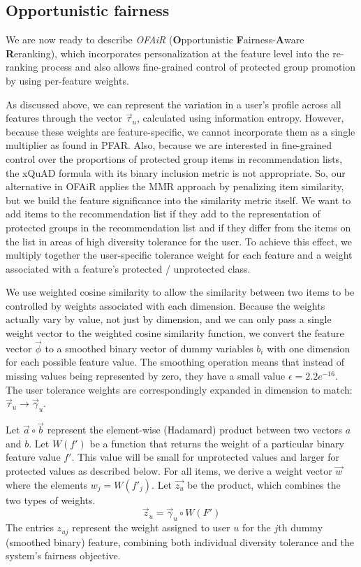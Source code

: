 \subsection{Opportunistic fairness}
\label{subsec:ofair_opp_fair}

We are now ready to describe \textit{OFAiR} (\textbf{O}pportunistic \textbf{F}airness-\textbf{A}ware \textbf{R}eranking), which incorporates personalization at the feature level into the re-ranking process and also allows fine-grained control of protected group promotion by using per-feature weights. 

As discussed above, we can represent the variation in a user's profile across all features through the vector $\vec{\tau}_u$, calculated using information entropy. However, because these weights are feature-specific, we cannot incorporate them as a single multiplier as found in PFAR. Also, because we are interested in fine-grained control over the proportions of protected group items in recommendation lists, the xQuAD formula with its binary inclusion metric is not appropriate. So, our alternative in OFAiR applies the MMR approach by penalizing item similarity, but we build the feature significance into the similarity metric itself. We want to add items to the recommendation list if they add to the representation of protected groups in the recommendation list and if they differ from the items on the list in areas of high diversity tolerance for the user. To achieve this effect, we multiply together the user-specific tolerance weight for each feature and a weight associated with a feature's protected / unprotected class. 

We use weighted cosine similarity to allow the similarity between two items to be controlled by weights associated with each dimension. Because the weights actually vary by value, not just by dimension, and we can only pass a single weight vector to the weighted cosine similarity function, we convert the feature vector $\vec{\phi}$ to a smoothed binary vector of dummy variables $b_i$ with one dimension for each possible feature value. The smoothing operation means that instead of missing values being represented by zero, they have a small value $\epsilon = 2.2e^{-16}$. The user tolerance weights are correspondingly expanded in dimension to match: $\vec{\tau}_u \rightarrow \vec{\gamma}_u$. 

Let $\vec{a} \circ \vec{b}$ represent the element-wise (Hadamard) product between two vectors $a$ and $b$. Let $W(f')$ be a function that returns the weight of a particular binary feature value $f'$. This value will be small for unprotected values and larger for protected values as described below. For all items, we derive a weight vector $\vec{w}$ where the elements $w_j = W(f'_{j})$. Let $\vec{z_{u}}$ be the product, which combines the two types of weights. %
\begin{equation}
\vec{z}_u = \vec{\gamma}_u \circ W(F')
\end{equation}
The entries $z_{uj}$ represent the weight assigned to user $u$ for the $j$th dummy (smoothed binary) feature, combining both individual diversity tolerance and the system's fairness objective.

